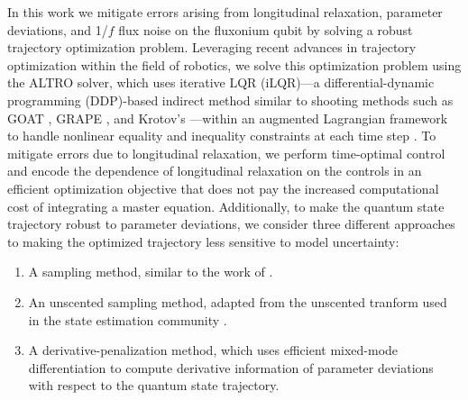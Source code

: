 In this work we mitigate
errors arising from longitudinal relaxation, parameter deviations, and 1/$f$ flux noise
on the fluxonium qubit \cite{zhang2020universal} by solving a robust trajectory 
optimization problem. 
Leveraging recent advances in trajectory optimization within the field of robotics, we
solve this optimization problem using the ALTRO solver, which uses iterative LQR 
(iLQR)---a differential-dynamic programming (DDP)-based indirect method similar to shooting
methods such as GOAT \cite{machnes2015gradient}, GRAPE
\cite{khaneja2005optimal, leung2017speedup}, and Krotov's \cite{goerz2019krotov}---within 
an augmented Lagrangian framework to handle nonlinear equality and inequality constraints at 
each time step \cite{howell2019altro}. 
To mitigate errors due to longitudinal
relaxation, we perform time-optimal control and
encode the dependence of longitudinal relaxation
on the controls in an efficient optimization objective that does
not pay the increased computational cost of integrating a master equation.
Additionally, to make the quantum state trajectory robust to parameter deviations,
we consider three different approaches to making the optimized trajectory less 
sensitive to model uncertainty:
\begin{enumerate}
  \item A sampling method, similar to the work of \cite{carvalho2020error, reinhold2019controlling, rembold2020introduction}.
  \item An unscented sampling method, adapted from the unscented tranform used in the 
  state estimation community \cite{howell2020direct, julier2004unscented, lee2013sigma, manchester2016derivative}.
  \item A derivative-penalization method, which uses efficient mixed-mode differentiation
  to compute derivative information of parameter deviations with respect to the 
  quantum state trajectory.
\end{enumerate}

